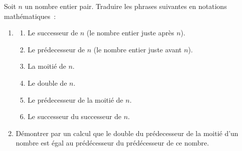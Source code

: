 \documentclass[exercice]{thedocument}%
\begin{document}
%
Soit $n$ un nombre entier pair. Traduire les phrases suivantes en notations mathématiques~:
\begin{enumerate}
    \item \begin{enumerate}
        \item Le successeur de $n$ (le nombre entier juste après $n$).
        \item Le prédecesseur de $n$ (le nombre entier juste avant $n$).
        \item La moitié de $n$.
        \item Le double de $n$.
        \item Le prédecesseur de la moitié de $n$.
        \item Le successeur du successeur de $n$.
    \end{enumerate}
    \item Démontrer par un calcul que le double du prédecesseur de la moitié d'un nombre
    est égal au prédécesseur du prédécesseur de ce nombre.
\end{enumerate}
\end{document}
